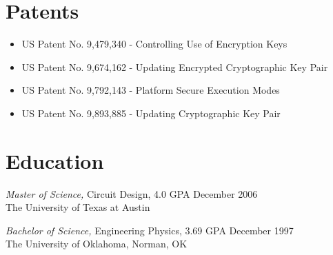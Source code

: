 \documentclass[overlapped]{res}
\begin{document}
\begin{resume}
\section{Patents}
\begin{itemize}
    \item US Patent No. 9,479,340 - Controlling Use of Encryption Keys
    \item US Patent No. 9,674,162 - Updating Encrypted Cryptographic Key Pair
    \item US Patent No. 9,792,143 - Platform Secure Execution Modes
    \item US Patent No. 9,893,885 - Updating Cryptographic Key Pair
\end{itemize}
\section{Education} 
{\sl Master of Science,} Circuit Design, 4.0 GPA \hfill December 2006\\
                The University of Texas at Austin                 

{\sl Bachelor of Science,} Engineering Physics, 3.69 GPA \hfill December 1997\\
                The University of Oklahoma, Norman, OK\\
\end{resume}
\end{document}
